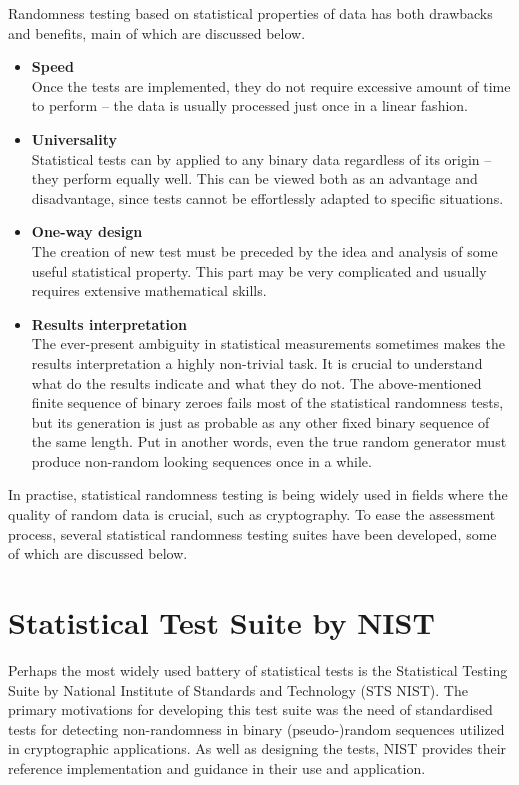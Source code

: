 \documentclass[12pt,oneside]{fithesis2}
\newcommand{\squarebullet}{\textcolor{black}{\raisebox{0.15em}{\rule{4pt}{4pt}}}}
\newenvironment{myItemize}{
  \begin{itemize}[leftmargin=2em,rightmargin=1em,itemsep=\parskip ,parsep=0em,topsep=0em,partopsep=0em]
  \renewcommand{\labelitemi}{\squarebullet}
  \renewcommand{\labelitemii}{$\diamond$}
}{
  \end{itemize}
}
\begin{document}
Randomness testing based on statistical properties of data has both drawbacks and benefits, main of which are discussed below.
\begin{myItemize}
\item \textbf{Speed}\\
Once the tests are implemented, they do not require excessive amount of time to perform -- 
the data is usually processed just once in a linear fashion.
\item \textbf{Universality}\\
Statistical tests can by applied to any binary data regardless of its origin -- they perform equally well. 
This can be viewed both as an advantage and disadvantage, since tests cannot be effortlessly adapted to specific situations.
\item \textbf{One-way design}\\
The creation of new test must be preceded by the idea and analysis of some useful statistical property. This part may be 
very complicated and usually requires extensive mathematical skills.
\item \textbf{Results interpretation}\\
The ever-present ambiguity in statistical measurements sometimes makes the results interpretation a highly non-trivial task.
It is crucial to understand what do the results indicate and what they do not. The above-mentioned finite sequence of binary zeroes
fails most of the statistical randomness tests, but its generation is just as probable 
as any other fixed binary sequence of the same length.
Put in another words, even the true random generator must produce non-random looking sequences once in a while.
\end{myItemize}

\noindent
In practise, statistical randomness testing is being widely used in fields where the quality of random data is crucial, 
such as cryptography. To ease the assessment process, several statistical randomness testing suites have been developed, 
some of which are discussed below.

\section{Statistical Test Suite by NIST}
\label{sec:sts-nist}

Perhaps the most widely used battery of statistical tests is the Statistical Testing Suite 
by National Institute of Standards and Technology (STS NIST).
The primary motivations for developing this test suite was the need of standardised tests for detecting non-randomness 
in binary (pseudo-)random sequences utilized in cryptographic applications. As well as designing the tests,
NIST provides their reference implementation and guidance in their use and application. \parencite{sts-nist}
\end{document}
